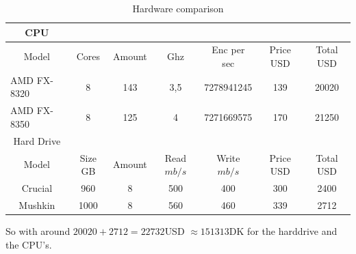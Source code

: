 \begin{table}[H]
\caption{Hardware comparison}
\label{my-label}
\begin{tabular}{|ccccccc}
\hline
\rowcolor[HTML]{EFEFEF}
CPU                                    &                             &                               &                           &                                 &                            & \multicolumn{1}{l|}{\cellcolor[HTML]{EFEFEF}} \\ \hline
\multicolumn{1}{|c|}{Model}            & \multicolumn{1}{c|}{Cores}   & \multicolumn{1}{c|}{Amount} & \multicolumn{1}{c|}{Ghz}  & \multicolumn{1}{c|}{Enc per sec} & \multicolumn{1}{c|}{Price USD} & \multicolumn{1}{c|}{Total USD}                    \\ \hline
\multicolumn{1}{|l|}{AMD FX-8320}      & 8                            & 143                         & 3,5                       & 7278941245                      & 139                    & 20020                                     \\
\multicolumn{1}{|l|}{AMD FX-8350}      & 8                            & 125                         & 4                         & 7271669575                      & 170                   & 21250                                    \\ \hline
\rowcolor[HTML]{EFEFEF}
Hard Drive                                                          &                               &                           &                                 &                           & & \multicolumn{1}{l|}{\cellcolor[HTML]{EFEFEF}} \\ \hline
\multicolumn{1}{|c|}{Model}            & \multicolumn{1}{c|}{Size GB} & \multicolumn{1}{c|}{Amount} & \multicolumn{1}{c|}{Read $mb/s$} & \multicolumn{1}{c|}{Write $mb/s$}      & \multicolumn{1}{c|}{Price USD} & \multicolumn{1}{c|}{Total USD}                    \\ \hline
\multicolumn{1}{|c|}{Crucial}          & 960                          & 8                           & 500                       & 400                             & 300                        & 2400                                          \\
\multicolumn{1}{|c|}{Mushkin} & 1000                         & 8                            & 560                       & 460                             & 339                        & 2712                                          \\ \cline{1-1}
\end{tabular}
\end{table}
So with around $20020+2712=22732 $USD $ \approx 151313 $DK for the harddrive and the CPU's.

